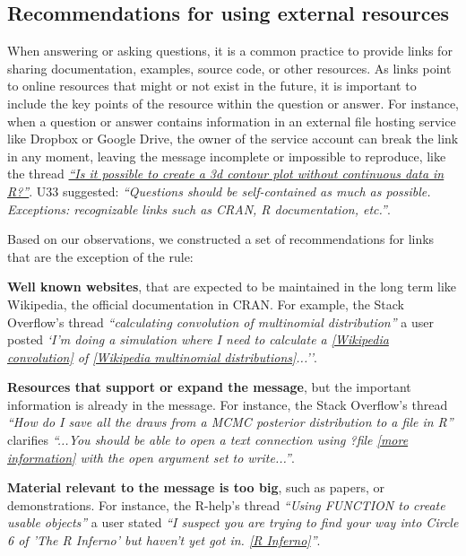 \documentclass{sig-alternate-05-2015}
\begin{document}
\subsection{Recommendations for using external resources}

	When answering or asking questions, it is a common practice to provide links for sharing documentation, examples, source code, or other resources.
	As links point to online resources that might or not exist in the future, it is important to include the key points of the resource within the question or answer.
	For instance, when a question or answer contains information in an external file hosting service like Dropbox or Google Drive, the owner of the service account can break the link in any moment, leaving the message incomplete or impossible to reproduce, like the thread \textit{\href{http://goo.gl/5nanFU}{``Is it possible to create a 3d contour plot without continuous data in R?''}}.
	U33 suggested: \textit{``Questions should be self-contained as much as possible. Exceptions: recognizable links such as CRAN, R documentation, etc.''}.

	Based on our observations, we constructed a set of recommendations for links that are the exception of the rule:

	\begin{description}
		\item \textbf{Well known websites}, that are expected to be maintained in the long term like Wikipedia, the official documentation in CRAN.
		For example, the Stack Overflow's thread \textit{``calculating convolution of multinomial distribution''} a user posted \textit{`I'm doing a simulation where I need to calculate a \href{https://en.wikipedia.org/wiki/Convolution_of_probability_distributions}{[Wikipedia convolution]} of \href{https://en.wikipedia.org/wiki/Multinomial_distribution}{[Wikipedia multinomial distributions]}...''}.

		\item \textbf{Resources that support or expand the message}, but the important information is already in the message.
		For instance, the Stack Overflow's thread \textit{``How do I save all the draws from a MCMC posterior distribution to a file in R''} clarifies \textit{``...You should be able to open a text connection using ?file \href{http://stat.ethz.ch/R-manual/R-devel/library/base/html/connections.html}{[more information]} with the open argument set to write...''}.

		\item \textbf{Material relevant to the message is too big}, such as papers, or demonstrations.
		For instance, the R-help's thread \textit{``Using FUNCTION to create usable objects''} a user stated \textit{``I suspect you are trying to find your way into Circle 6 of 'The R Inferno' but haven't yet got in. \href{http://www.burns-stat.com/pages/Tutor/R\_inferno.pdf}{[R Inferno]}''}.
	\end{description}
\end{document}
